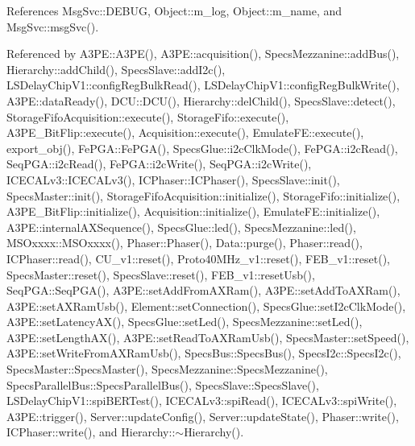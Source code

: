 References Msg\+Svc\+::\+D\+E\+B\+UG, Object\+::m\+\_\+log, Object\+::m\+\_\+name, and Msg\+Svc\+::msg\+Svc().



Referenced by A3\+P\+E\+::\+A3\+P\+E(), A3\+P\+E\+::acquisition(), Specs\+Mezzanine\+::add\+Bus(), Hierarchy\+::add\+Child(), Specs\+Slave\+::add\+I2c(), L\+S\+Delay\+Chip\+V1\+::config\+Reg\+Bulk\+Read(), L\+S\+Delay\+Chip\+V1\+::config\+Reg\+Bulk\+Write(), A3\+P\+E\+::data\+Ready(), D\+C\+U\+::\+D\+C\+U(), Hierarchy\+::del\+Child(), Specs\+Slave\+::detect(), Storage\+Fifo\+Acquisition\+::execute(), Storage\+Fifo\+::execute(), A3\+P\+E\+\_\+\+Bit\+Flip\+::execute(), Acquisition\+::execute(), Emulate\+F\+E\+::execute(), export\+\_\+obj(), Fe\+P\+G\+A\+::\+Fe\+P\+G\+A(), Specs\+Glue\+::i2c\+Clk\+Mode(), Fe\+P\+G\+A\+::i2c\+Read(), Seq\+P\+G\+A\+::i2c\+Read(), Fe\+P\+G\+A\+::i2c\+Write(), Seq\+P\+G\+A\+::i2c\+Write(), I\+C\+E\+C\+A\+Lv3\+::\+I\+C\+E\+C\+A\+Lv3(), I\+C\+Phaser\+::\+I\+C\+Phaser(), Specs\+Slave\+::init(), Specs\+Master\+::init(), Storage\+Fifo\+Acquisition\+::initialize(), Storage\+Fifo\+::initialize(), A3\+P\+E\+\_\+\+Bit\+Flip\+::initialize(), Acquisition\+::initialize(), Emulate\+F\+E\+::initialize(), A3\+P\+E\+::internal\+A\+X\+Sequence(), Specs\+Glue\+::led(), Specs\+Mezzanine\+::led(), M\+S\+Oxxxx\+::\+M\+S\+Oxxxx(), Phaser\+::\+Phaser(), Data\+::purge(), Phaser\+::read(), I\+C\+Phaser\+::read(), C\+U\+\_\+v1\+::reset(), Proto40\+M\+Hz\+\_\+v1\+::reset(), F\+E\+B\+\_\+v1\+::reset(), Specs\+Master\+::reset(), Specs\+Slave\+::reset(), F\+E\+B\+\_\+v1\+::reset\+Usb(), Seq\+P\+G\+A\+::\+Seq\+P\+G\+A(), A3\+P\+E\+::set\+Add\+From\+A\+X\+Ram(), A3\+P\+E\+::set\+Add\+To\+A\+X\+Ram(), A3\+P\+E\+::set\+A\+X\+Ram\+Usb(), Element\+::set\+Connection(), Specs\+Glue\+::set\+I2c\+Clk\+Mode(), A3\+P\+E\+::set\+Latency\+A\+X(), Specs\+Glue\+::set\+Led(), Specs\+Mezzanine\+::set\+Led(), A3\+P\+E\+::set\+Length\+A\+X(), A3\+P\+E\+::set\+Read\+To\+A\+X\+Ram\+Usb(), Specs\+Master\+::set\+Speed(), A3\+P\+E\+::set\+Write\+From\+A\+X\+Ram\+Usb(), Specs\+Bus\+::\+Specs\+Bus(), Specs\+I2c\+::\+Specs\+I2c(), Specs\+Master\+::\+Specs\+Master(), Specs\+Mezzanine\+::\+Specs\+Mezzanine(), Specs\+Parallel\+Bus\+::\+Specs\+Parallel\+Bus(), Specs\+Slave\+::\+Specs\+Slave(), L\+S\+Delay\+Chip\+V1\+::spi\+B\+E\+R\+Test(), I\+C\+E\+C\+A\+Lv3\+::spi\+Read(), I\+C\+E\+C\+A\+Lv3\+::spi\+Write(), A3\+P\+E\+::trigger(), Server\+::update\+Config(), Server\+::update\+State(), Phaser\+::write(), I\+C\+Phaser\+::write(), and Hierarchy\+::$\sim$\+Hierarchy().


